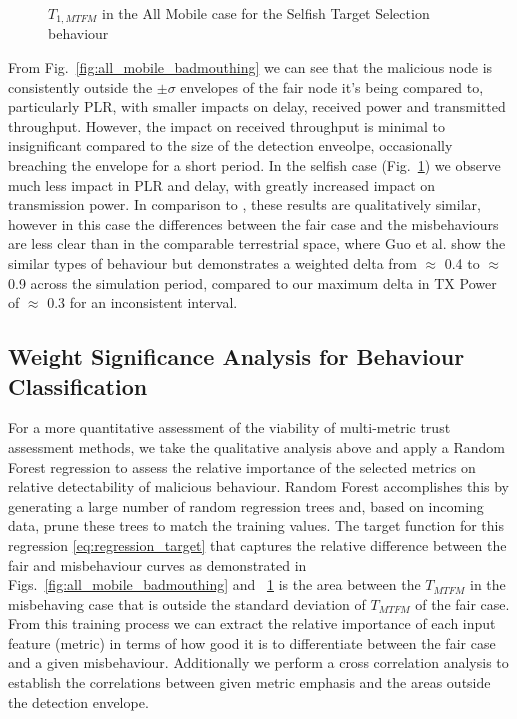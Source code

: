 \documentclass[conference]{IEEEtran}
\begin{document}
\begin{figure}[h]
\caption{$T_{1,MTFM}$ in the All Mobile case for the Selfish Target Selection behaviour}
\label{fig:all_mobile_selfish}
\end{figure}

From Fig.~\ref{fig:all_mobile_badmouthing} we can see that the malicious node is consistently outside the $\pm\sigma$ envelopes of the fair node it's being compared to, particularly PLR, with smaller impacts on delay, received power and transmitted throughput. 
However, the impact on received throughput is minimal to insignificant compared to the size of the detection enveolpe, occasionally breaching the envelope for a short period. 
In the selfish case (Fig.~\ref{fig:all_mobile_selfish}) we observe much less impact in PLR and delay, with greatly increased impact on transmission power.
In comparison to \cite{Guo11}, these results are qualitatively similar, however in this case the differences between the fair case and the misbehaviours are less clear than in the comparable terrestrial space, where Guo et al. show the similar types of behaviour but demonstrates a weighted delta from $\approx$ 0.4 to $\approx$ 0.9 across the simulation period, compared to our maximum delta in TX Power of $\approx$ 0.3 for an inconsistent interval.


\subsection{Weight Significance Analysis for Behaviour Classification}

For a more quantitative assessment of the viability of multi-metric trust assessment methods, we take the qualitative analysis above and apply a Random Forest regression \cite{Breiman2001} to assess the relative importance of the selected metrics on relative detectability of malicious behaviour. 
Random Forest accomplishes this by generating a large number of random regression trees and, based on incoming data, prune these trees to match the training values.
The target function for this regression \eqref{eq:regression_target} that captures the relative difference between the fair and misbehaviour curves as demonstrated in Figs.~\ref{fig:all_mobile_badmouthing} and ~\ref{fig:all_mobile_selfish} is the area between the $T_{MTFM}$ in the misbehaving case that is outside the standard deviation of $T_{MTFM}$ of the fair case.
From this training process we can extract the relative importance of each input feature (metric) in terms of how good it is to differentiate between the fair case and a given misbehaviour.
Additionally we perform a cross correlation analysis to establish the correlations between given metric emphasis and the areas outside the detection envelope.
\end{document}
